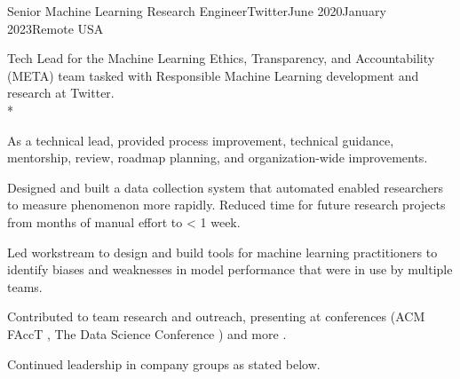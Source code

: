 \documentclass[print]{friggeri-cv} %
\begin{document}
\begin{job}
  {\twittericon}{Senior Machine Learning Research Engineer}{Twitter}{June 2020}{January 2023}{Remote \textemdash USA}{
      Tech Lead for the Machine Learning Ethics, Transparency, and Accountability
      (META) team tasked with Responsible Machine Learning development and
      research at Twitter.\\*
      \begin{myitemize}
        \item As a technical lead, provided process improvement, technical guidance,
        mentorship, review, roadmap planning, and organization-wide improvements. 
        
        \item Designed and built a data collection system that
        automated enabled researchers to measure phenomenon more rapidly. Reduced time
        for future research projects from months of manual effort to < 1 week.
        
        \item Led workstream to design and build tools for machine learning
        practitioners to identify biases and weaknesses in model performance
        that were in use by multiple teams.
        
        \item Contributed to team research\autocite{twitter_htl_racial_bias}
        \autocite{twitter_recsys_distributional_inequality} and outreach,
        presenting at conferences (ACM FAccT \autocite{facct_2022_talk}, The
        Data Science Conference \autocite{datascience_2022_talk}) and more
        \autocite{privacy_enchancing_tech_post}.

        \item Continued leadership in company groups as stated below.

      \end{myitemize}
  }
  \end{job}
\end{document}
